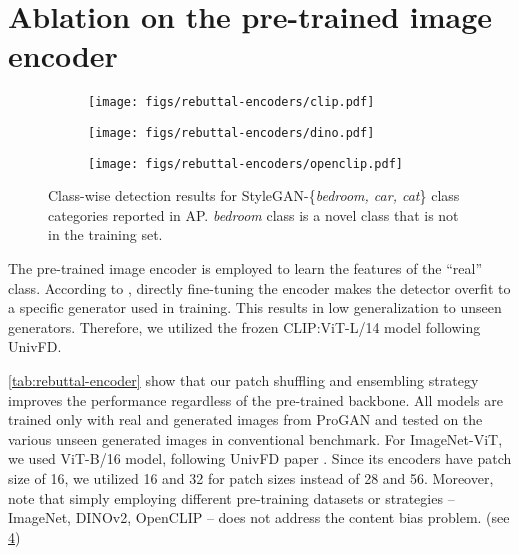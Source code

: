 \section{Ablation on the pre-trained image encoder}
\label{sec:suppl_pretrained}

\begin{figure}[t]
    \centering
    \begin{subfigure}[t]{0.32\linewidth}
        \centering
        \texttt{[image: figs/rebuttal-encoders/clip.pdf]}
        \label{fig:rebuttal-encoder-clip}
    \end{subfigure}
    \begin{subfigure}[t]{0.32\linewidth}
        \centering
        \texttt{[image: figs/rebuttal-encoders/dino.pdf]}
        \label{fig:rebuttal-encoder-dino}
    \end{subfigure}
    \begin{subfigure}[t]{0.32\linewidth}
        \centering
        \texttt{[image: figs/rebuttal-encoders/openclip.pdf]}
        \label{fig:rebuttal-encoder-openclip}
    \end{subfigure}
    \caption{Class-wise detection results for StyleGAN-\{\emph{bedroom, car, cat}\} class categories reported in AP. \emph{bedroom} class is a novel class that is not in the training set.}
    \label{fig:rebuttal-encoders}
\end{figure}


The pre-trained image encoder is employed to learn the features of the ``real'' class.
According to \cite{ojha2023towards}, directly fine-tuning the encoder makes the detector overfit to a specific generator used in training. This results in low generalization to unseen generators.
Therefore, we utilized the frozen CLIP:ViT-L/14 model following UnivFD.

\cref{tab:rebuttal-encoder} show that our patch shuffling and ensembling strategy improves the performance regardless of the pre-trained backbone.
All models are trained only with real and generated images from ProGAN and tested on the various unseen generated images in conventional benchmark. For ImageNet-ViT, we used ViT-B/16 model, following UnivFD paper \cite{ojha2023towards}. Since its encoders have patch size of 16, we utilized 16 and 32 for patch sizes instead of 28 and 56.
Moreover, note that simply employing different pre-training datasets or strategies -- ImageNet, DINOv2, OpenCLIP -- does not address the content bias problem. (see \cref{fig:rebuttal-encoders}) 



